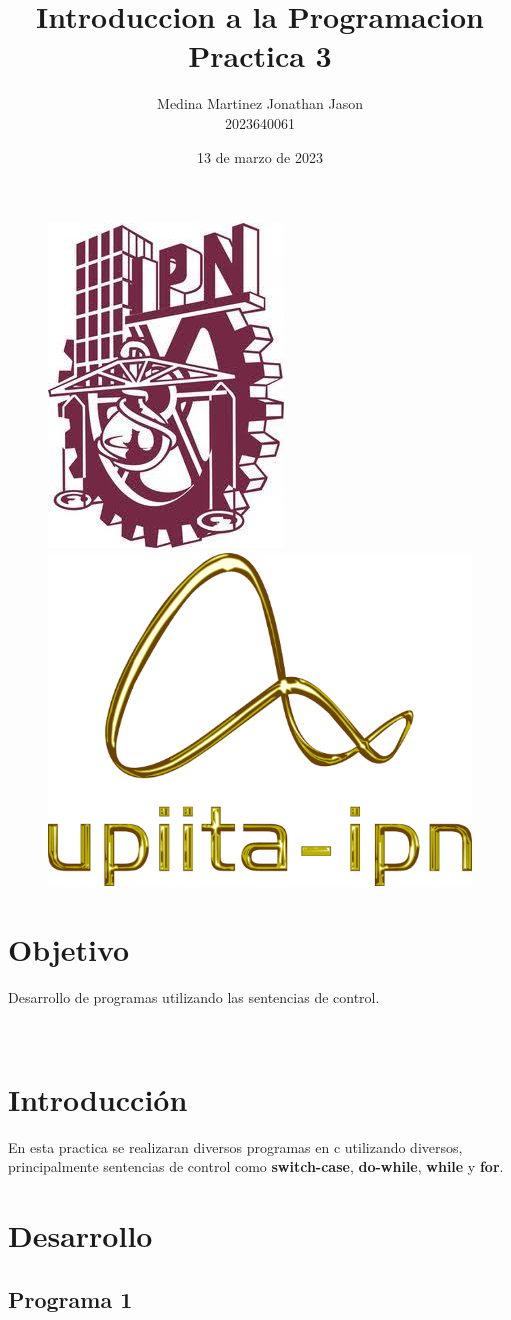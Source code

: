 \documentclass{article}
\title{Introduccion a la Programacion \\ Practica 3}
\author{Medina Martinez Jonathan Jason \\ 2023640061}
\date{13 de marzo de 2023}
\begin{document}

\fontsize{12}{16}\selectfont

\begin{figure}[t] %

\includegraphics[width=2.5 cm]{Logo1.jpeg}
\hfill
\includegraphics[width=3 cm]{Logo2.png}

\end{figure}

\maketitle %
\newpage

\tableofcontents %
\newpage

\section{Objetivo}

Desarrollo de programas utilizando las sentencias de control.

\
\
\

\section{Introducción}

En esta practica se realizaran diversos programas en c utilizando diversos, principalmente sentencias de control como \textbf{switch-case}, \textbf{do-while}, \textbf{while} y \textbf{for}.

\newpage

\section{Desarrollo}
\subsection{Programa 1}
\end{document}
